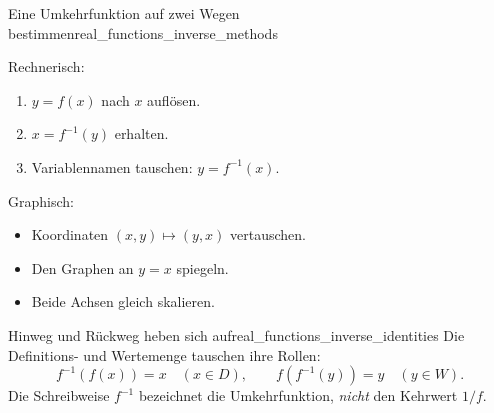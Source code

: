 \begin{KeyPointBox}{Eine Umkehrfunktion auf zwei Wegen bestimmen}{real_functions_inverse_methods}
  \begin{minipage}[t]{0.45\linewidth}
    \raggedright
    Rechnerisch:
    \begin{enumerate}[label=\arabic*)]
      \item $y=f(x)$ nach $x$ auflösen.
      \item $x=f^{-1}(y)$ erhalten.
      \item Variablennamen tauschen: $y=f^{-1}(x)$.
    \end{enumerate}
  \end{minipage}\hfill
  \begin{minipage}[t]{0.45\linewidth}
    \raggedright
    Graphisch:
    \begin{itemize}
      \item Koordinaten $(x,y)\mapsto(y,x)$ vertauschen.
      \item Den Graphen an $y=x$ spiegeln.
      \item Beide Achsen gleich skalieren.
    \end{itemize}
  \end{minipage}
\end{KeyPointBox}

\begin{KeyPointBox}{Hinweg und Rückweg heben sich auf}{real_functions_inverse_identities}
  Die Definitions- und \textcolor{green!55!black}{Wertemenge} tauschen ihre Rollen:
  \[
    f^{-1}(f(x))=x\quad(x\in D),\qquad
    f(f^{-1}(y))=y\quad(y\in W).
  \]
  Die Schreibweise $f^{-1}$ bezeichnet die Umkehrfunktion,
  \emph{nicht} den Kehrwert $1/f$.
\end{KeyPointBox}

